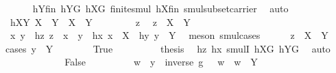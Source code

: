 \begin{isabellebody}
\ \ \ \ \isamarkupfalse%
\ hYfin\ hYG\ hXG\ finite{\isacharunderscore}{\kern0pt}smul\ hXfin\ smul{\isacharunderscore}{\kern0pt}subset{\isacharunderscore}{\kern0pt}carrier\ \isamarkupfalse%
\ auto\isanewline
\ \ \isamarkupfalse%
\ hXY{}{\isacharcolon}{\kern0pt}\ {\isachardoublequoteopen}{\isacharquery}{\kern0pt}X{}\ {\isasymcdots}\ {\isacharquery}{\kern0pt}Y{}\ {\isasymsubseteq}\ X\ {\isasymcdots}\ Y{\isachardoublequoteclose}\isanewline
\ \ \isamarkupfalse%
\isanewline
\ \ \ \ \isamarkupfalse%
\ z\ \isamarkupfalse%
\ {\isachardoublequoteopen}z\ {\isasymin}\ {\isacharquery}{\kern0pt}X{}\ {\isasymcdots}\ {\isacharquery}{\kern0pt}Y{}{\isachardoublequoteclose}\isanewline
\ \ \ \ \isamarkupfalse%
\ \isamarkupfalse%
\ x\ y\ \ hz{\isacharcolon}{\kern0pt}\ {\isachardoublequoteopen}z\ {\isacharequal}{\kern0pt}\ x\ {\isasymcdot}\ y{\isachardoublequoteclose}\ \ hx{\isacharcolon}{\kern0pt}\ {\isachardoublequoteopen}x\ {\isasymin}\ {\isacharquery}{\kern0pt}X{}{\isachardoublequoteclose}\ \ hy{\isacharcolon}{\kern0pt}\ {\isachardoublequoteopen}y\ {\isasymin}\ {\isacharquery}{\kern0pt}Y{}{\isachardoublequoteclose}\ \isamarkupfalse%
\ {\isacharparenleft}{\kern0pt}meson\ smul{\isachardot}{\kern0pt}cases{\isacharparenright}{\kern0pt}\isanewline
\ \ \ \ \isamarkupfalse%
\ {\isachardoublequoteopen}z\ {\isasymin}\ X\ {\isasymcdots}\ Y{\isachardoublequoteclose}\isanewline
\ \ \ \ \isamarkupfalse%
{\isacharparenleft}{\kern0pt}cases\ {\isachardoublequoteopen}y\ {\isasymin}\ Y{\isachardoublequoteclose}{\isacharparenright}{\kern0pt}\isanewline
\ \ \ \ \ \ \isamarkupfalse%
\ True\isanewline
\ \ \ \ \ \ \isamarkupfalse%
\ \isamarkupfalse%
\ {\isacharquery}{\kern0pt}thesis\ \isamarkupfalse%
\ hz\ hx\ smulI\ hXG\ hYG\ \isamarkupfalse%
\ auto\isanewline
\ \ \ \ \isamarkupfalse%
\isanewline
\ \ \ \ \ \ \isamarkupfalse%
\ False\isanewline
\ \ \ \ \ \ \isamarkupfalse%
\ \isamarkupfalse%
\ w\ \ {\isachardoublequoteopen}y\ {\isacharequal}{\kern0pt}\ inverse\ g\ {\isasymcdot}\ \ w{\isachardoublequoteclose}\ \ {\isachardoublequoteopen}w\ {\isasymin}\ Y{\isachardoublequoteclose}\ \isamarkupfalse%

\end{isabellebody}
